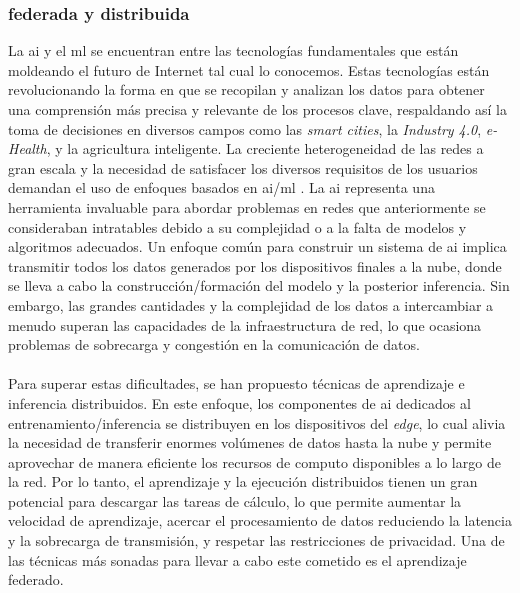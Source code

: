 \subsubsection{ federada y distribuida}

La \gls{ai} y el \gls{ml} se encuentran entre las tecnologías fundamentales que están moldeando el futuro de Internet tal cual lo conocemos. Estas tecnologías están revolucionando la forma en que se recopilan y analizan los datos para obtener una comprensión más precisa y relevante de los procesos clave, respaldando así la toma de decisiones en diversos campos como las \textit{smart cities}, la \textit{Industry 4.0}, \textit{e-Health}, y la agricultura inteligente. La creciente heterogeneidad de las redes a gran escala y la necesidad de satisfacer los diversos requisitos de los usuarios demandan el uso de enfoques basados en \gls{ai}/\gls{ml} \cite{pan2021network}. La \gls{ai} representa una herramienta invaluable para abordar problemas en redes que anteriormente se consideraban intratables debido a su complejidad o a la falta de modelos y algoritmos adecuados. Un enfoque común para construir un sistema de \gls{ai} implica transmitir todos los datos generados por los dispositivos finales a la nube, donde se lleva a cabo la construcción/formación del modelo y la posterior inferencia. Sin embargo, las grandes cantidades y la complejidad de los datos a intercambiar a menudo superan las capacidades de la infraestructura de red, lo que ocasiona problemas de sobrecarga y congestión en la comunicación de datos.\\
\\
Para superar estas dificultades, se han propuesto técnicas de aprendizaje e inferencia distribuidos. En este enfoque, los componentes de \gls{ai} dedicados al entrenamiento/inferencia se distribuyen en los dispositivos del \textit{edge}, lo cual alivia la necesidad de transferir enormes volúmenes de datos hasta la nube y permite aprovechar de manera eficiente los recursos de computo disponibles a lo largo de la red.  Por lo tanto, el aprendizaje y la ejecución distribuidos tienen un gran potencial para descargar las tareas de cálculo, lo que permite aumentar la velocidad de aprendizaje, acercar el procesamiento de datos reduciendo la latencia y la sobrecarga de transmisión, y respetar las restricciones de privacidad. Una de las técnicas más sonadas para llevar a cabo este cometido es el aprendizaje federado. \\
\\
